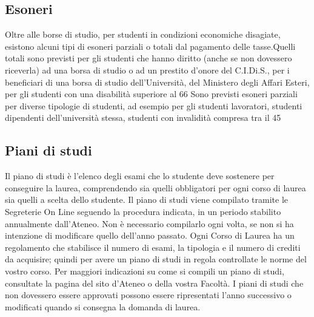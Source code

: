\subsection{Esoneri}
Oltre alle borse di studio, per studenti in condizioni economiche disagiate, esistono alcuni tipi di esoneri parziali o totali dal pagamento delle tasse.Quelli totali sono previsti per gli studenti che hanno diritto (anche se non dovessero riceverla) ad una borsa di studio o ad un prestito d'onore del C.I.Di.S., per i beneficiari di una borsa di studio dell'Università, del Ministero degli Affari Esteri, per gli studenti con una disabilità superiore al 66%
Sono previsti esoneri parziali per diverse tipologie di studenti, ad esempio per gli studenti lavoratori, studenti dipendenti dell'università stessa, studenti con invalidità compresa tra il 45%

\subsection{Piani di studi}
Il piano di studi è l'elenco degli esami che lo studente deve sostenere per conseguire la laurea, comprendendo sia quelli obbligatori per ogni corso di laurea sia quelli a scelta dello studente. Il piano di studi viene compilato tramite le Segreterie On Line seguendo la procedura indicata, in un periodo stabilito annualmente dall'Ateneo. Non è necessario compilarlo ogni volta, se non si ha intenzione di modificare quello dell'anno passato. 
Ogni Corso di Laurea ha un regolamento che stabilisce il numero di esami, la tipologia e il numero di crediti da acquisire; quindi per avere un piano di studi in regola controllate le norme del vostro corso. Per maggiori indicazioni su come si compili un piano di studi, consultate la pagina del sito d'Ateneo o della vostra Facoltà. I piani di studi che non dovessero essere approvati possono essere ripresentati l'anno successivo o modificati quando si consegna la domanda di laurea.
